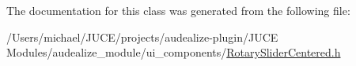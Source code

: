 The documentation for this class was generated from the following file\+:\begin{DoxyCompactItemize}
\item 
/\+Users/michael/\+J\+U\+C\+E/projects/audealize-\/plugin/\+J\+U\+C\+E Modules/audealize\+\_\+module/ui\+\_\+components/\hyperlink{_rotary_slider_centered_8h}{Rotary\+Slider\+Centered.\+h}\end{DoxyCompactItemize}

